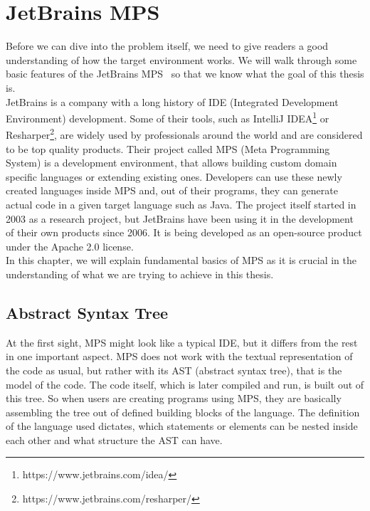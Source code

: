 \chapter{JetBrains MPS}
\label{chap:jetbrains_mps}

Before we can dive into the problem itself, we need to give readers a good understanding of how the target environment works.
We will walk through some basic features of the JetBrains MPS~\cite{MPS} so that we know what the goal of this thesis is.
\\

JetBrains is a company with a long history of IDE (Integrated Development Environment) development.
Some of their tools, such as IntelliJ IDEA\footnote{https://www.jetbrains.com/idea/} or Resharper\footnote{https://www.jetbrains.com/resharper/}, are widely used by professionals around the world and are considered to be top quality products.
Their project called MPS (Meta Programming System) is a development environment, that allows building custom domain specific languages or extending existing ones.
Developers can use these newly created languages inside MPS and, out of their programs, they can generate actual code in a given target language such as Java.
The project itself started in 2003 as a research project, but JetBrains have been using it in the development of their own products since 2006.
It is being developed as an open-source product under the Apache 2.0 license.
\\

In this chapter, we will explain fundamental basics of MPS as it is crucial in the understanding of what we are trying to achieve in this thesis.

\section{Abstract Syntax Tree}
At the first sight, MPS might look like a typical IDE, but it differs from the rest in one important aspect.
MPS does not work with the textual representation of the code as usual, but rather with its AST (abstract syntax tree), that is the model of the code.
The code itself, which is later compiled and run, is built out of this tree.
So when users are creating programs using MPS, they are basically assembling the tree out of defined building blocks of the language.
The definition of the language used dictates, which statements or elements can be nested inside each other and what structure the AST can have.
\\

